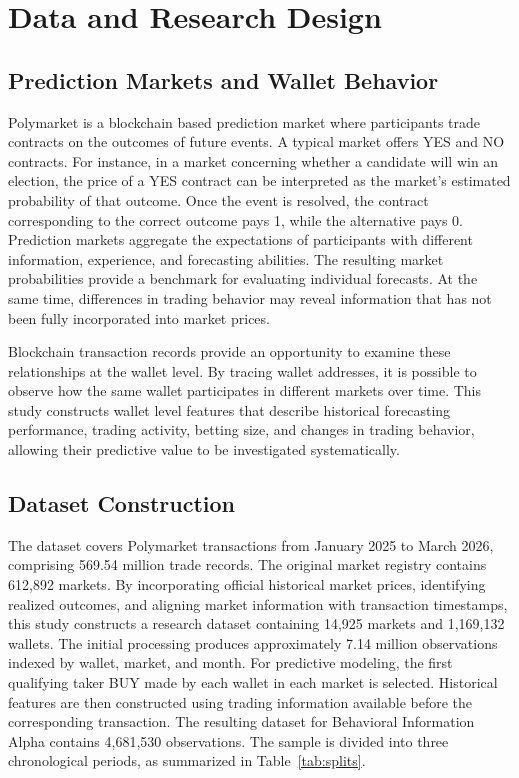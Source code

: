 \section{Data and Research Design}\label{sec:data}

\subsection{Prediction Markets and Wallet Behavior}

Polymarket is a blockchain based prediction market where participants trade contracts on the outcomes of future events. A typical market offers YES and NO contracts. For instance, in a market concerning whether a candidate will win an election, the price of a YES contract can be interpreted as the market's estimated probability of that outcome. Once the event is resolved, the contract corresponding to the correct outcome pays 1, while the alternative pays 0. Prediction markets aggregate the expectations of participants with different information, experience, and forecasting abilities. The resulting market probabilities provide a benchmark for evaluating individual forecasts. At the same time, differences in trading behavior may reveal information that has not been fully incorporated into market prices.

Blockchain transaction records provide an opportunity to examine these relationships at the wallet level. By tracing wallet addresses, it is possible to observe how the same wallet participates in different markets over time. This study constructs wallet level features that describe historical forecasting performance, trading activity, betting size, and changes in trading behavior, allowing their predictive value to be investigated systematically.

\subsection{Dataset Construction}

The dataset covers Polymarket transactions from January 2025 to March 2026, comprising 569.54 million trade records. The original market registry contains 612,892 markets. By incorporating official historical market prices, identifying realized outcomes, and aligning market information with transaction timestamps, this study constructs a research dataset containing 14,925 markets and 1,169,132 wallets. The initial processing produces approximately 7.14 million observations indexed by wallet, market, and month. For predictive modeling, the first qualifying taker BUY made by each wallet in each market is selected. Historical features are then constructed using trading information available before the corresponding transaction. The resulting dataset for Behavioral Information Alpha contains 4,681,530 observations. The sample is divided into three chronological periods, as summarized in Table~\ref{tab:splits}.

